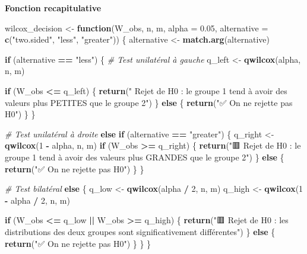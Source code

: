 \documentclass[
  12pt,
]{article}
\newenvironment{Shaded}{\begin{snugshade}}{\end{snugshade}}
\newcommand{\AttributeTok}[1]{\textcolor[rgb]{0.13,0.29,0.53}{#1}}
\newcommand{\CommentTok}[1]{\textcolor[rgb]{0.56,0.35,0.01}{\textit{#1}}}
\newcommand{\ControlFlowTok}[1]{\textcolor[rgb]{0.13,0.29,0.53}{\textbf{#1}}}
\newcommand{\DecValTok}[1]{\textcolor[rgb]{0.00,0.00,0.81}{#1}}
\newcommand{\FloatTok}[1]{\textcolor[rgb]{0.00,0.00,0.81}{#1}}
\newcommand{\FunctionTok}[1]{\textcolor[rgb]{0.13,0.29,0.53}{\textbf{#1}}}
\newcommand{\NormalTok}[1]{#1}
\newcommand{\OtherTok}[1]{\textcolor[rgb]{0.56,0.35,0.01}{#1}}
\newcommand{\SpecialCharTok}[1]{\textcolor[rgb]{0.81,0.36,0.00}{\textbf{#1}}}
\newcommand{\StringTok}[1]{\textcolor[rgb]{0.31,0.60,0.02}{#1}}
\begin{document}
\textbf{Fonction recapitulative}

\begin{Shaded}
\begin{Highlighting}[]
\NormalTok{wilcox\_decision }\OtherTok{\textless{}{-}} \ControlFlowTok{function}\NormalTok{(W\_obs, n, m, }\AttributeTok{alpha =} \FloatTok{0.05}\NormalTok{, }
                            \AttributeTok{alternative =} \FunctionTok{c}\NormalTok{(}\StringTok{"two.sided"}\NormalTok{, }\StringTok{"less"}\NormalTok{, }\StringTok{"greater"}\NormalTok{)) \{}
\NormalTok{  alternative }\OtherTok{\textless{}{-}} \FunctionTok{match.arg}\NormalTok{(alternative)}
  
\ControlFlowTok{if}\NormalTok{ (alternative }\SpecialCharTok{==} \StringTok{"less"}\NormalTok{) \{}
  \CommentTok{\# Test unilatéral à gauche}
\NormalTok{  q\_left }\OtherTok{\textless{}{-}} \FunctionTok{qwilcox}\NormalTok{(alpha,  n, m)}
  
  \ControlFlowTok{if}\NormalTok{ (W\_obs }\SpecialCharTok{\textless{}=}\NormalTok{ q\_left) \{}
    \FunctionTok{return}\NormalTok{(}\StringTok{" Rejet de H0 : le groupe 1 tend à avoir des valeurs plus PETITES que le groupe 2"}\NormalTok{)}
\NormalTok{  \} }\ControlFlowTok{else}\NormalTok{ \{}
    \FunctionTok{return}\NormalTok{(}\StringTok{"✅ On ne rejette pas H0"}\NormalTok{)}
\NormalTok{  \}}
\NormalTok{\}}

   \CommentTok{\# Test unilatéral à droite}
  \ControlFlowTok{else} \ControlFlowTok{if}\NormalTok{ (alternative }\SpecialCharTok{==} \StringTok{"greater"}\NormalTok{) \{}
\NormalTok{    q\_right }\OtherTok{\textless{}{-}} \FunctionTok{qwilcox}\NormalTok{(}\DecValTok{1} \SpecialCharTok{{-}}\NormalTok{ alpha,  n, m)}
    \ControlFlowTok{if}\NormalTok{ (W\_obs }\SpecialCharTok{\textgreater{}=}\NormalTok{ q\_right) \{}
      \FunctionTok{return}\NormalTok{(}\StringTok{"🟥 Rejet de H0 : le groupe 1 tend à avoir des valeurs plus GRANDES que le groupe 2"}\NormalTok{)}
\NormalTok{    \} }\ControlFlowTok{else}\NormalTok{ \{}
      \FunctionTok{return}\NormalTok{(}\StringTok{"✅ On ne rejette pas H0"}\NormalTok{)}
\NormalTok{    \}}
\NormalTok{    \} }
  
  \CommentTok{\# Test bilatéral}
  \ControlFlowTok{else}\NormalTok{ \{}
\NormalTok{    q\_low }\OtherTok{\textless{}{-}} \FunctionTok{qwilcox}\NormalTok{(alpha }\SpecialCharTok{/} \DecValTok{2}\NormalTok{,  n, m)}
\NormalTok{    q\_high }\OtherTok{\textless{}{-}} \FunctionTok{qwilcox}\NormalTok{(}\DecValTok{1} \SpecialCharTok{{-}}\NormalTok{ alpha }\SpecialCharTok{/} \DecValTok{2}\NormalTok{,  n, m)}
    
    \ControlFlowTok{if}\NormalTok{ (W\_obs }\SpecialCharTok{\textless{}=}\NormalTok{ q\_low }\SpecialCharTok{||}\NormalTok{ W\_obs }\SpecialCharTok{\textgreater{}=}\NormalTok{ q\_high) \{}
      \FunctionTok{return}\NormalTok{(}\StringTok{"🟥 Rejet de H0 : les distributions des deux groupes sont significativement différentes"}\NormalTok{)}
\NormalTok{    \} }\ControlFlowTok{else}\NormalTok{ \{}
      \FunctionTok{return}\NormalTok{(}\StringTok{"✅ On ne rejette pas H0"}\NormalTok{)}
\NormalTok{    \}}
\NormalTok{  \}}
\NormalTok{\}}
\end{Highlighting}
\end{Shaded}
\end{document}

